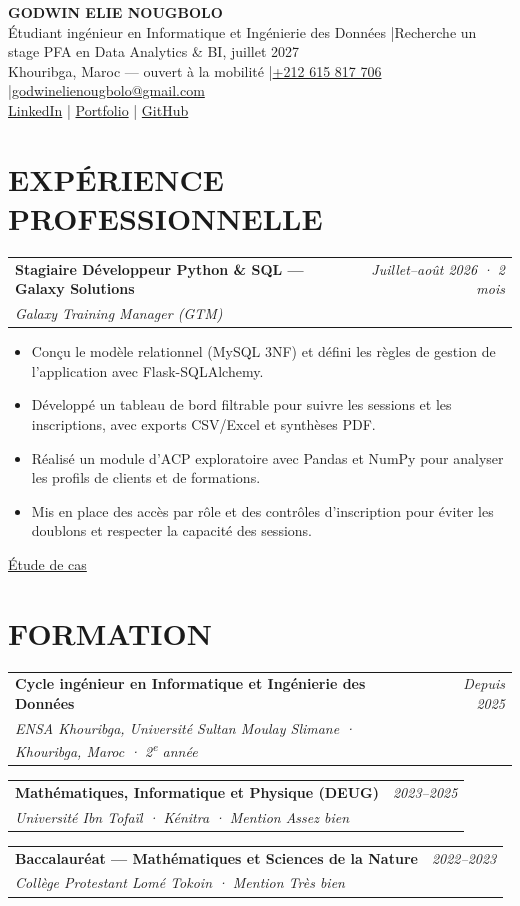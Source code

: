 \documentclass[a4paper,10pt]{article}
\makeatletter
\newcommand{\entryHeader}[3]{%
  \noindent
  \begin{tabularx}{\linewidth}{@{}X r@{}}
    \textbf{#1} & \textcolor{grisClair}{\small\textit{#3}} \\
    \textcolor{gris}{\textit{\small #2}} & \\
  \end{tabularx}%
  \vspace{1pt}%
}
\newcommand{\compactListStart}{%
  \begin{itemize}[topsep=1pt,itemsep=0pt,parsep=0pt,partopsep=0pt,leftmargin=1.3em]
}
\newcommand{\compactListEnd}{\end{itemize}}
\makeatother
\begin{document}
\begin{center}
  {\Large\bfseries\color{bleu} GODWIN ELIE NOUGBOLO}\\[2pt]
  {\small\color{gris}
    Étudiant ingénieur en Informatique et Ingénierie des Données
    \enspace|\enspace Recherche un stage PFA en Data Analytics \& BI, juillet 2027
  }\\[3pt]
  {\small\color{gris}
    Khouribga, Maroc — ouvert à la mobilité
    \enspace|\enspace \href{tel:+212615817706}{+212 615 817 706}
    \enspace|\enspace \href{mailto:godwinelienougbolo@gmail.com}{godwinelienougbolo@gmail.com}
  }\\[2pt]
  {\small
    \href{https://www.linkedin.com/in/godwin-elie-nougbolo}{LinkedIn}
    \enspace|\enspace
    \href{https://godwin-elie-portfolio.vercel.app}{Portfolio}
    \enspace|\enspace
    \href{https://github.com/Godwin-08}{GitHub}
  }
\end{center}

\vspace{2pt}

\section{EXPÉRIENCE PROFESSIONNELLE}

\entryHeader
  {Stagiaire Développeur Python \& SQL — Galaxy Solutions}
  {Galaxy Training Manager (GTM)}
  {Juillet–août 2026 · 2 mois}
\compactListStart
  \item Conçu le modèle relationnel (MySQL 3NF) et défini les règles de gestion de l’application avec Flask-SQLAlchemy.
  \item Développé un tableau de bord filtrable pour suivre les sessions et les inscriptions, avec exports CSV/Excel et synthèses PDF.
  \item Réalisé un module d’ACP exploratoire avec Pandas et NumPy pour analyser les profils de clients et de formations.
  \item Mis en place des accès par rôle et des contrôles d’inscription pour éviter les doublons et respecter la capacité des sessions.
\compactListEnd
{\footnotesize\hfill \href{https://godwin-elie-portfolio.vercel.app/projets/gtm}{Étude de cas}}

\section{FORMATION}

\entryHeader
  {Cycle ingénieur en Informatique et Ingénierie des Données}
  {ENSA Khouribga, Université Sultan Moulay Slimane · Khouribga, Maroc · 2\textsuperscript{e} année}
  {Depuis 2025}
\entryHeader
  {Mathématiques, Informatique et Physique (DEUG)}
  {Université Ibn Tofaïl · Kénitra · Mention Assez bien}
  {2023–2025}
\entryHeader
  {Baccalauréat — Mathématiques et Sciences de la Nature}
  {Collège Protestant Lomé Tokoin · Mention Très bien}
  {2022–2023}
\end{document}
